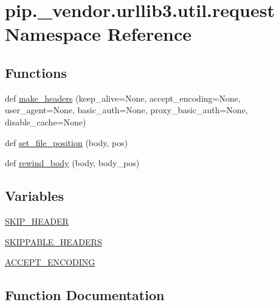 \hypertarget{namespacepip_1_1__vendor_1_1urllib3_1_1util_1_1request}{}\section{pip.\+\_\+vendor.\+urllib3.\+util.\+request Namespace Reference}
\label{namespacepip_1_1__vendor_1_1urllib3_1_1util_1_1request}
\subsection*{Functions}
\begin{DoxyCompactItemize}
\item 
def \hyperlink{namespacepip_1_1__vendor_1_1urllib3_1_1util_1_1request_a50c6d400d81fd0bc7e9618eb301085a0}{make\+\_\+headers} (keep\+\_\+alive=None, accept\+\_\+encoding=None, user\+\_\+agent=None, basic\+\_\+auth=None, proxy\+\_\+basic\+\_\+auth=None, disable\+\_\+cache=None)
\item 
def \hyperlink{namespacepip_1_1__vendor_1_1urllib3_1_1util_1_1request_a9669107e7f9df3e15b03ee825c79b96a}{set\+\_\+file\+\_\+position} (body, pos)
\item 
def \hyperlink{namespacepip_1_1__vendor_1_1urllib3_1_1util_1_1request_af3514df102b2e3bafa34690419e6d7f2}{rewind\+\_\+body} (body, body\+\_\+pos)
\end{DoxyCompactItemize}
\subsection*{Variables}
\begin{DoxyCompactItemize}
\item 
\hyperlink{namespacepip_1_1__vendor_1_1urllib3_1_1util_1_1request_aa209332eb985d32ac990e200aabfa1cf}{S\+K\+I\+P\+\_\+\+H\+E\+A\+D\+ER}
\item 
\hyperlink{namespacepip_1_1__vendor_1_1urllib3_1_1util_1_1request_a765ace68a4741b585ebd3d290fde113b}{S\+K\+I\+P\+P\+A\+B\+L\+E\+\_\+\+H\+E\+A\+D\+E\+RS}
\item 
\hyperlink{namespacepip_1_1__vendor_1_1urllib3_1_1util_1_1request_a4a84608dee70695d1c935ab959a72f96}{A\+C\+C\+E\+P\+T\+\_\+\+E\+N\+C\+O\+D\+I\+NG}
\end{DoxyCompactItemize}


\subsection{Function Documentation}
\mbox{\label{namespacepip_1_1__vendor_1_1urllib3_1_1util_1_1request_a50c6d400d81fd0bc7e9618eb301085a0}} 
